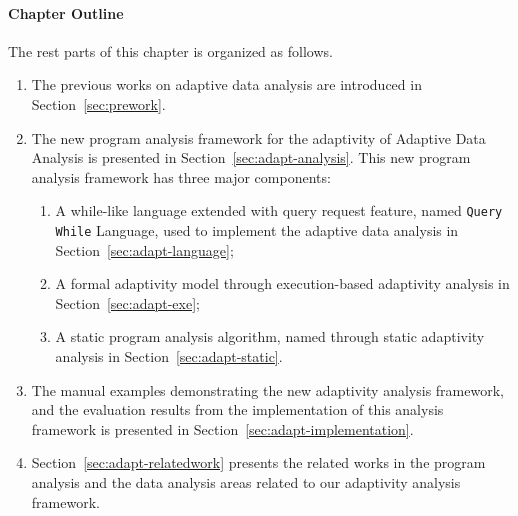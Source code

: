 \paragraph*{Chapter Outline}
The rest parts of this chapter is organized as follows. 
\begin{enumerate}
   \item The previous works on adaptive data analysis are introduced in Section~\ref{sec:prework}.
   \item The new program analysis framework for the adaptivity of Adaptive Data Analysis is presented 
   in Section~\ref{sec:adapt-analysis}.
   This new program analysis framework has three major components:
   \begin{enumerate}
      \item A while-like language extended with query request feature, named {\tt Query While} Language, 
      used to implement the adaptive data analysis in Section~\ref{sec:adapt-language};
      \item A formal adaptivity model through execution-based adaptivity analysis in Section~\ref{sec:adapt-exe};
      \item A static program analysis algorithm, named {\THESYSTEM} through static adaptivity analysis in Section~\ref{sec:adapt-static}.
   \end{enumerate}
   \item The manual examples demonstrating the new adaptivity analysis framework,
   and the evaluation results from the implementation
   of this analysis framework is presented in Section~\ref{sec:adapt-implementation}.
   \item Section~\ref{sec:adapt-relatedwork} presents the related works in the program analysis and the data analysis areas
   related to our adaptivity analysis framework.
\end{enumerate}


